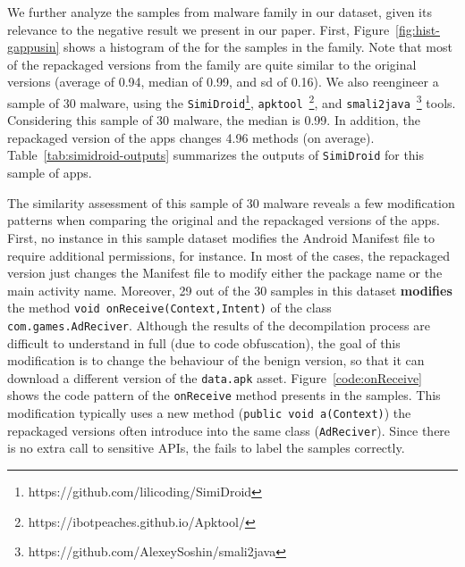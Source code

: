 

We further analyze the samples from \gps malware family in our dataset, given its
relevance to the negative result we present in our paper. First,
Figure~\ref{fig:hist-gappusin} shows a histogram of the \sscore for the samples
in the \gps family. Note that most of the repackaged versions from the
\gps family are quite similar to the original versions (average \sscore
of 0.94, median \sscore of 0.99, and sd of 0.16). We also reengineer
a sample of 30 \gps malware, using the \texttt{SimiDroid}\footnote{https://github.com/lilicoding/SimiDroid},
\texttt{apktool}~\footnote{https://ibotpeaches.github.io/Apktool/},
and \texttt{smali2java}~\footnote{https://github.com/AlexeySoshin/smali2java} tools.
Considering this sample of 30 \gps malware, the median \sscore is 0.99. In addition,
the repackaged version of the apps changes 4.96 methods (on average). Table~\ref{tab:simidroid-outputs} summarizes
the outputs of \texttt{SimiDroid} for this sample of \gps apps.

The similarity assessment of this sample of 30 \gps malware reveals a few modification patterns when comparing the original and the
repackaged versions of the apps. First, no instance in this \gps sample dataset
modifies the Android Manifest file to require additional permissions, for instance.
In most of the cases, the repackaged version just changes the Manifest file to modify either
the package name or the main activity name. Moreover, 29 out of the 30 samples in this dataset  {\bf modifies} the 
method \texttt{void onReceive(Context,Intent)} of the class \texttt{com.games.AdReciver}. Although the results of the
decompilation process are difficult to understand in full (due to code obfuscation),
the goal of this modification is to change the behaviour of the benign version, so that it can
download a different version of the \texttt{data.apk} 
asset. Figure~\ref{code:onReceive} shows
the code pattern of the \texttt{onReceive} method presents in the samples. This modification
typically uses a new method (\texttt{public void a(Context)})
the repackaged versions often introduce into the same class (\texttt{AdReciver}).
Since there is no extra call to sensitive APIs, the \mas fails to label
the \gps samples correctly. 

